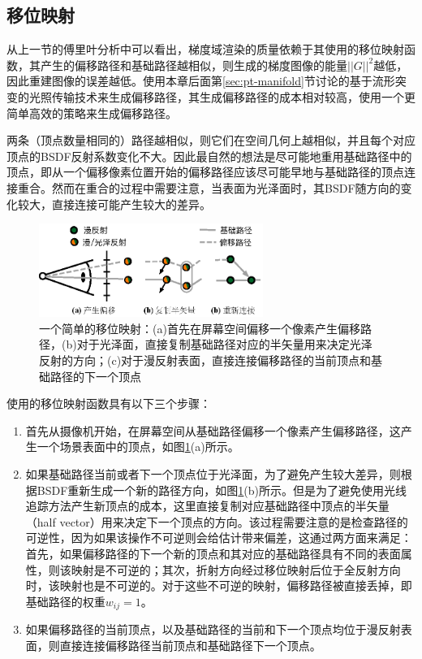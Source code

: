 \subsection{移位映射}\label{sec:pt-gradient-mapping}
从上一节的傅里叶分析中可以看出，梯度域渲染的质量依赖于其使用的移位映射函数，其产生的偏移路径和基础路径越相似，则生成的梯度图像的能量$||G||^2$越低，因此重建图像的误差越低。\cite{a:GradientDomainMetropolisLightTransport,a:ImprovedSamplingforGradientDomainMetropolisLightTransport}使用本章后面第\ref{sec:pt-manifold}节讨论的基于流形突变的光照传输技术来生成偏移路径，其生成偏移路径的成本相对较高，\cite{a:GradientDomainPathTracing}使用一个更简单高效的策略来生成偏移路径。

两条（顶点数量相同的）路径越相似，则它们在空间几何上越相似，并且每个对应顶点的BSDF反射系数变化不大。因此最自然的想法是尽可能地重用基础路径中的顶点，即从一个偏移像素位置开始的偏移路径应该尽可能早地与基础路径的顶点连接重合。然而在重合的过程中需要注意，当表面为光泽面时，其BSDF随方向的变化较大，直接连接可能产生较大的差异。

\begin{figure}
	\sidecaption
	\includegraphics[width=0.65\textwidth]{figures/pt/copy-shift-mapping}
	\caption{一个简单的移位映射：(a)首先在屏幕空间偏移一个像素产生偏移路径，(b)对于光泽面，直接复制基础路径对应的半矢量用来决定光泽反射的方向；(c)对于漫反射表面，直接连接偏移路径的当前顶点和基础路径的下一个顶点}
	\label{f:pt-copy-shift-mapping}
\end{figure}

\cite{a:GradientDomainPathTracing}使用的移位映射函数具有以下三个步骤：

\begin{enumerate}
	\item 首先从摄像机开始，在屏幕空间从基础路径偏移一个像素产生偏移路径，这产生一个场景表面中的顶点，如图\ref{f:pt-copy-shift-mapping}(a)所示。
	\item 如果基础路径当前或者下一个顶点位于光泽面，为了避免产生较大差异，则根据BSDF重新生成一个新的路径方向，如图\ref{f:pt-copy-shift-mapping}(b)所示。但是为了避免使用光线追踪方法产生新顶点的成本，这里直接复制对应基础路径中顶点的半矢量（half vector）用来决定下一个顶点的方向。该过程需要注意的是检查路径的可逆性，因为如果该操作不可逆则会给估计带来偏差，这通过两方面来满足：首先，如果偏移路径的下一个新的顶点和其对应的基础路径具有不同的表面属性，则该映射是不可逆的；其次，折射方向经过移位映射后位于全反射方向时，该映射也是不可逆的。对于这些不可逆的映射，偏移路径被直接丢掉，即基础路径的权重$w_{ij}=1$。
	\item 如果偏移路径的当前顶点，以及基础路径的当前和下一个顶点均位于漫反射表面，则直接连接偏移路径当前顶点和基础路径下一个顶点。
\end{enumerate}

